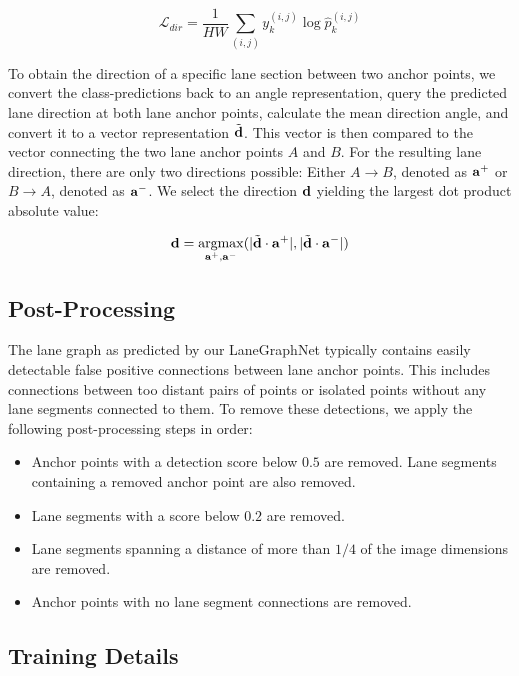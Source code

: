 \documentclass[letterpaper, 10 pt, conference]{ieeeconf}
\DeclareMathOperator*{\argmax}{argmax}
\begin{document}
\begin{equation}
    \mathcal{L}_{dir} = \frac{1}{HW} \sum_{(i,j)} y_k^{(i,j)} \log \hat{p}_k^{(i,j)}
\end{equation}
 

To obtain the direction of a specific lane section between two anchor points, we convert the class-predictions back to an angle representation, query the predicted lane direction at both lane anchor points, calculate the mean direction angle, and convert it to a vector representation $\Tilde{\bold{d}}$. This vector is then compared to the vector connecting the two lane anchor points $A$ and $B$. For the resulting lane direction, there are only two directions possible: Either $A \xrightarrow{} B$, denoted as $\bold{a^{+}}$ or $B \xrightarrow{} A$, denoted as $\bold{a^{-}}$. We select the direction $\bold{d}$ yielding the largest dot product absolute value:

\begin{equation}
\bold{d} = \argmax_{\bold{a^{+}}, \bold{a^{-}}}(|\Tilde{\bold{d}} \cdot \bold{a^{+}}|, |\Tilde{\bold{d}} \cdot \bold{a^{-}}|)    
\end{equation}


\subsection{Post-Processing}

The lane graph as predicted by our LaneGraphNet typically contains easily detectable false positive connections between lane anchor points. This includes connections between too distant pairs of points or isolated points without any lane segments connected to them. To remove these detections, we apply the following post-processing steps in order:

\begin{itemize}
    \item Anchor points with a detection score below $0.5$ are removed. Lane segments containing a removed anchor point are also removed.
    \item Lane segments with a score below $0.2$ are removed.
    \item Lane segments spanning a distance of more than $1/4$ of the image dimensions are removed.
    \item Anchor points with no lane segment connections are removed.
\end{itemize}



\subsection{Training Details}
\end{document}
